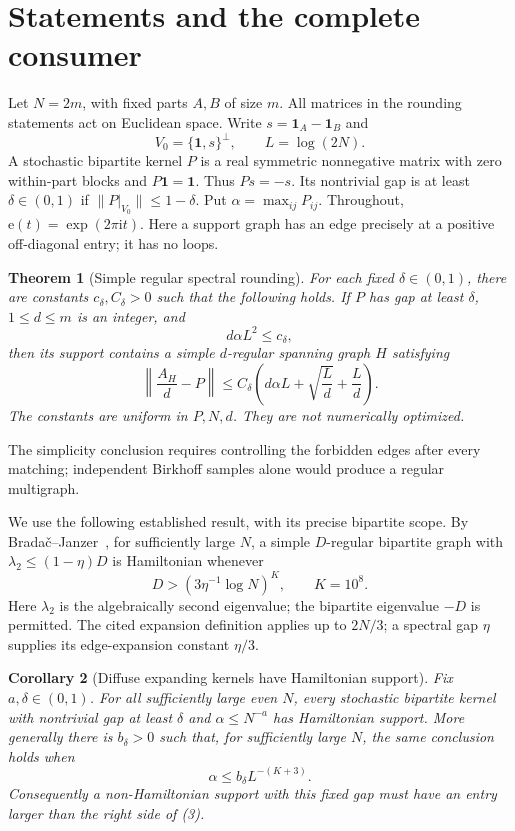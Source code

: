 \documentclass[11pt]{article}
\newtheorem{theorem}{Theorem}[section]
\newtheorem{corollary}[theorem]{Corollary}
\theoremstyle{remark}
\newcommand{\one}{\mathbf1}
\newcommand{\e}{\mathrm e}
\begin{document}
\section{Statements and the complete consumer}
Let \(N=2m\), with fixed parts \(A,B\) of size \(m\).
All matrices in the rounding statements act on Euclidean space.
Write \(s=\one_A-\one_B\) and
\[
 V_0=\{\one,s\}^{\perp},\qquad L=\log(2N).
\]
A stochastic bipartite kernel \(P\) is a real symmetric nonnegative
matrix with zero within-part blocks and \(P\one=\one\).
Thus \(Ps=-s\).
Its nontrivial gap is at least \(\delta\in(0,1)\) if
\(\|P|_{V_0}\|\leq1-\delta\).
Put \(\alpha=\max_{ij}P_{ij}\).
Throughout, \(\e(t)=\exp(2\pi\mathrm{i}t)\).
Here a support graph has an edge precisely at a positive off-diagonal
entry; it has no loops.

\begin{theorem}[Simple regular spectral rounding]\label{thm:rounding}
For each fixed \(\delta\in(0,1)\), there are constants
\(c_\delta,C_\delta>0\) such that the following holds.
If \(P\) has gap at least \(\delta\), \(1\leq d\leq m\)
is an integer, and
\[
 d\alpha L^2\leq c_\delta,
\]
then its support contains a simple \(d\)-regular spanning graph \(H\)
satisfying
\[
 \left\|\frac{A_H}{d}-P\right\|
 \leq C_\delta\left(
      d\alpha L+\sqrt{\frac{L}{d}}+\frac{L}{d}\right).
 \tag{1}
\]
The constants are uniform in \(P,N,d\).
They are not numerically optimized.
\end{theorem}

The simplicity conclusion requires controlling the forbidden edges
after every matching; independent Birkhoff samples alone would
produce a regular multigraph.

We use the following established result, with its precise bipartite
scope. By Brada\v{c}--Janzer~\cite[Corollary 1.4]{BJ}, for sufficiently
large \(N\), a simple \(D\)-regular bipartite graph with
\(\lambda_2\leq(1-\eta)D\) is Hamiltonian whenever
\[
 D>(3\eta^{-1}\log N)^K,\qquad K=10^8.                       \tag{2}
\]
Here \(\lambda_2\) is the algebraically second eigenvalue; the
bipartite eigenvalue \(-D\) is permitted.
The cited expansion definition applies up to \(2N/3\);
a spectral gap \(\eta\) supplies its edge-expansion constant
\(\eta/3\).

\begin{corollary}[Diffuse expanding kernels have Hamiltonian support]
\label{cor:weightedhamilton}
Fix \(a,\delta\in(0,1)\).
For all sufficiently large even \(N\), every stochastic bipartite
kernel with nontrivial gap at least \(\delta\) and
\(\alpha\leq N^{-a}\) has Hamiltonian support.
More generally there is \(b_\delta>0\) such that, for sufficiently
large \(N\), the same conclusion holds when
\[
 \alpha\leq b_\delta L^{-(K+3)}.                              \tag{3}
\]
Consequently a non-Hamiltonian support with this fixed gap must
have an entry larger than the right side of (3).
\end{corollary}
\end{document}
